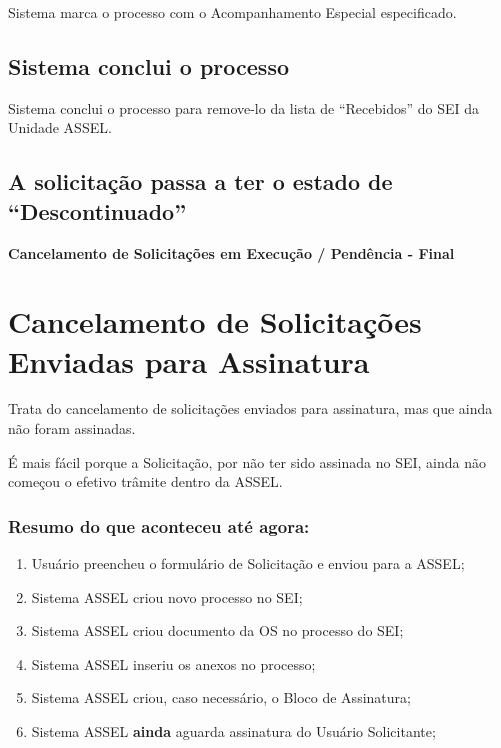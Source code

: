 Sistema marca o processo com o Acompanhamento Especial especificado.

\subsection{Sistema conclui o processo}

Sistema conclui o processo para remove-lo da lista de ``Recebidos'' do SEI da Unidade ASSEL.


\subsection{A solicitação passa a ter o estado de ``Descontinuado''}

\Large
\begin{center}
	\textbf{Cancelamento de Solicitações em Execução / Pendência - Final}
\end{center}
\normalsize

\section{Cancelamento de Solicitações Enviadas para Assinatura}	

Trata do cancelamento de solicitações enviados para assinatura, mas que ainda não foram assinadas.

É mais fácil porque a Solicitação, por não ter sido assinada no SEI, ainda não começou o efetivo trâmite dentro da ASSEL.

\subsubsection{Resumo do que aconteceu até agora:}

\begin{enumerate}
	\item Usuário preencheu o formulário de Solicitação e enviou para a ASSEL;

	\item Sistema ASSEL criou novo processo no SEI;
	
	\item Sistema ASSEL criou documento da OS no processo do SEI;
	
	\item Sistema ASSEL inseriu os anexos no processo;
	
	\item Sistema ASSEL criou, caso necessário, o Bloco de Assinatura;
	
	\item Sistema ASSEL \textbf{ainda} aguarda assinatura do Usuário Solicitante;
\end{enumerate}
  

